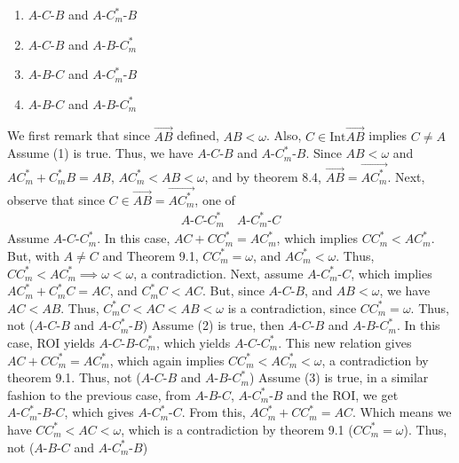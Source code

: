 \documentclass{report}
\begin{document}
    \begin{enumerate}
        \item $ A\text{-}C\text{-}B $ and $ A\text{-}C_{m}^{*}\text{-} B$
        \item $ A\text{-}C\text{-}B$ and $ A\text{-}B\text{-}C_{m}^{*} $
        \item $ A\text{-}B\text{-}C $ and $ A\text{-}C^{*}_{m}\text{-}B $
        \item $ A\text{-}B\text{-}C$ and $ A\text{-}B\text{-}C_{m}^{*} $
    \end{enumerate}
    We first remark that since $\overrightarrow{AB}  $ defined, $AB < \omega$. Also, $C \in \text{Int}\overrightarrow{AB}  $ implies $C \ne A $
    \bigbreak \noindent 
    Assume (1) is true. Thus, we have $ A\text{-}C\text{-}B$ and $  A\text{-}C_{m}^{*}\text{-}B$. Since $ AB < \omega$ and $ AC_{m}^{*} + C_{m}^{*}B = AB$, $AC_{m}^{*} < AB < \omega$, and by theorem 8.4, $\overrightarrow{AB} = \overrightarrow{AC_{m}^{*}} $. Next, observe that since $C \in \overrightarrow{AB} = \overrightarrow{AC_{m}^{*}} $, one of
    \begin{align*}
        A\text{-}C\text{-}C_{m}^{*} \quad A\text{-}C_{m}^{*}\text{-}C
    \end{align*}
    Assume $ A\text{-}C\text{-}C_{m}^{*}$. In this case, $AC + CC_{m}^{*} = AC_{m}^{*}$, which implies $CC_{m}^{*} < AC_{m}^{*}$. But, with $A \ne C$ and Theorem 9.1, $CC_{m}^{*} = \omega$, and $AC_{m}^{*} < \omega$. Thus, $CC_{m}^{*} < AC_{m}^{*} \implies \omega < \omega$, a contradiction.
    \bigbreak \noindent 
    Next, assume $ A\text{-}C_{m}^{*}\text{-}C$, which implies $ AC_{m}^{*} + C_{m}^{*}C = AC$, and $C_{m}^{*}C < AC$. But, since $ A\text{-}C\text{-}B$, and $AB < \omega$, we have $AC < AB$. Thus, $C_{m}^{*}C < AC < AB < \omega$ is a contradiction, since $CC_{m}^{*} = \omega $. Thus, not ($ A\text{-}C\text{-}B$ and $ A\text{-}C_{m}^{*}\text{-}B $)
    \bigbreak \noindent 
    Assume (2) is true, then $ A\text{-}C\text{-}B$ and $ A\text{-}B\text{-}C_{m}^{*}$. In this case, ROI yields $ A\text{-}C\text{-}B\text{-}C_{m}^{*}$, which yields $ A\text{-}C\text{-}C_{m}^{*}$. This new relation gives $AC + CC_{m}^{*} = AC_{m}^{*}$, which again implies $CC_{m}^{*} < AC_{m}^{*} < \omega$, a contradiction by theorem 9.1. Thus, not ($ A\text{-}C\text{-}B$ and $A\text{-}B\text{-}C_{m}^{*}$)
    \bigbreak \noindent 
    Assume (3) is true, in a similar fashion to the previous case, from $ A\text{-}B\text{-}C$, $ A\text{-}C_{m}^{*}\text{-}B$ and the ROI, we get $ A\text{-}C_{m}^{*}\text{-}B\text{-}C $, which gives $ A\text{-}C_{m}^{*}\text{-}C$. From this, $AC_{m}^{*} +CC_{m}^{*} = AC$. Which means we have $ CC_{m}^{*} < AC < \omega$, which is a contradiction by theorem 9.1 ($CC_{m}^{*} = \omega$). Thus, not ($ A\text{-}B\text{-}C $ and $ A\text{-}C_{m}^{*}\text{-}B $)
\end{document}
